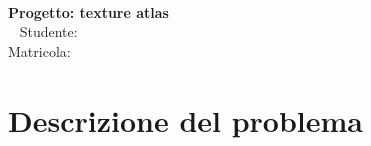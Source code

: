 

\begin{center}
	\hspace{0pt}
	\vfill
	\Huge{
		\textbf{\thetitle} \\
		\LARGE{\textbf{Progetto: texture atlas}} \\
		\ \newline \newline \newline
		\Large{	Studente: \textbf{\theauthor} } \\
		\normalsize{{Matricola: \textbf{\matNum}} }
	}
	\vfill
	\hspace{0pt}
\end{center}
\newpage




\tableofcontents    
\newpage





\section{Descrizione del problema}


 

